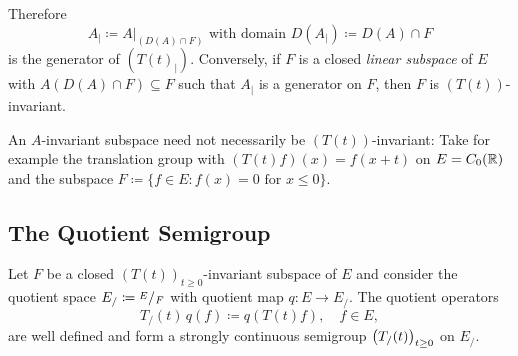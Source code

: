 Therefore
\[
    A_{|} \coloneq A\big|_{ (D(A)\cap F)} \text{ with domain } D(A_{|}) \coloneq D(A) \cap F
\]
is the generator of\/ $(T(t)_{|})$.
%
Conversely, if\/ $F$ is a closed \emph{linear subspace} of\/ $E$ with $A(D(A) \cap F) \subseteq F$ such that 
$A_{|}$ is a generator on $F$, then $F$ is $(T(t))$-invariant.

An $A$-invariant subspace need not necessarily be $(T(t))$-invariant:
Take for example the translation group with $(T(t)f)(x) = f(x+t)$ on $E = C_{0}(\mathbb{R})$ and the subspace $F \coloneq \{f \in E \colon f(x) = 0 \text{ for } x \leq 0\}$.
\subsection{The Quotient Semigroup}\label{subsec:a1-3.4}%
Let $F$ be a closed $(T(t))_{t \geq 0}$-invariant subspace of $E$ and consider the quotient space $E_{/} \coloneq \mfrac{E}{F}$ with quotient map $q \colon E \to E_{/}$.
The quotient operators
\[
    T_{/}(t)\,q(f) \coloneq q(T(t)f), \quad f \in E,
\]
are well defined and form a strongly continuous semigroup $\mleft(T_{/}(t)\mright)_{t \geq 0}$ on $E_{/}$.

